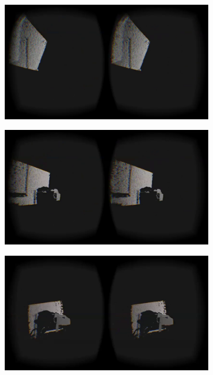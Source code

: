 \documentclass[pageno]{jpaper}
\begin{document}
\begin{figure}
  \centering
  \begin{subfigure}[b]{0.3\textwidth}
    \includegraphics[width=\textwidth]{shot3.png}
    \label{fig:gull}
  \end{subfigure}%
  \qquad
  \begin{subfigure}[b]{0.3\textwidth}
    \includegraphics[width=\textwidth]{shot4.png}
    \label{fig:tiger}
  \end{subfigure}
  \qquad
  \begin{subfigure}[b]{0.3\textwidth}
    \includegraphics[width=\textwidth]{shot5.png}

\end{subfigure}
\end{figure}
\end{document}
